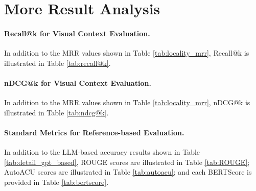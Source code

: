 \section{More Result Analysis}
\label{more_result_analysis}

\paragraph{Recall@k for Visual Context Evaluation.} In addition to the MRR values shown in Table \ref{tab:locality_mrr}, Recall@k is illustrated in Table \ref{tab:recall@k}.



\paragraph{nDCG@k for Visual Context Evaluation.} In addition to the MRR values shown in Table \ref{tab:locality_mrr}, nDCG@k is illustrated in Table \ref{tab:ndcg@k}.



\paragraph{Standard Metrics for Reference-based Evaluation.} In addition to the LLM-based accuracy results shown in Table \ref{tab:detail_gpt_based}, ROUGE scores are illustrated in Table \ref{tab:ROUGE}; AutoACU scores \cite{autoacu} are illustrated in Table \ref{tab:autoacu}; and each BERTScore \cite{zhang2020bertscore} is provided in Table \ref{tab:bertscore}.




